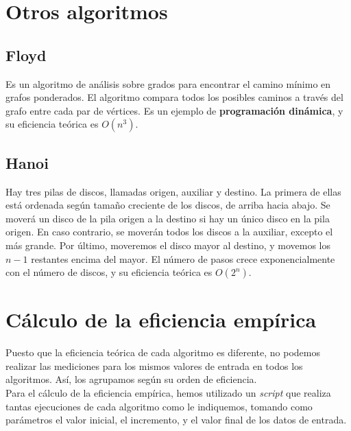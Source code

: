 \documentclass[11pt]{article}
\begin{document}
\section*{Otros algoritmos}

\subsection*{Floyd}
Es un algoritmo de análisis sobre grados para encontrar el camino mínimo en grafos ponderados. El algoritmo compara todos los posibles caminos a través del grafo entre cada par de vértices. Es un ejemplo de \textbf{programación dinámica}, y su eficiencia teórica es $O(n^3)$.

\begin{center}
	
\end{center}

\subsection*{Hanoi}
Hay tres pilas de discos, llamadas origen, auxiliar y destino. La primera de ellas está ordenada según tamaño creciente de los discos, de arriba hacia abajo. Se moverá un disco de la pila origen a la destino si hay un único disco en la pila origen. En caso contrario, se moverán todos los discos a la auxiliar, excepto el más grande. Por último, moveremos el disco mayor al destino, y movemos los $n-1$ restantes encima del mayor. El número de pasos crece exponencialmente con el número de discos, y su eficiencia teórica es $O(2^n)$.

\begin{center}
	
\end{center}

\section*{Cálculo de la eficiencia empírica}

Puesto que la eficiencia teórica de cada algoritmo es diferente, no podemos realizar las mediciones para los mismos valores de entrada en todos los algoritmos. Así, los agrupamos según su orden de eficiencia.\\

Para el cálculo de la eficiencia empírica, hemos utilizado un \textit{script} que realiza tantas ejecuciones de cada algoritmo como le indiquemos, tomando como parámetros el valor inicial, el incremento, y el valor final de los datos de entrada.\\
\end{document}
